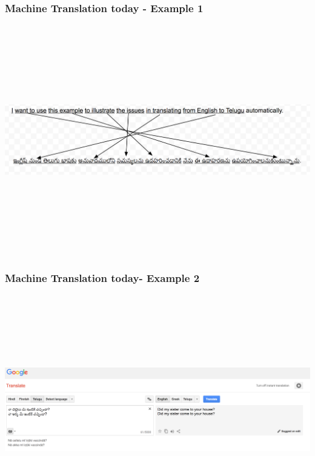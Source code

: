 \documentclass{beamer}
\begin{document}
\begin{frame}
\frametitle{Machine Translation today - Example 1}
\includegraphics[height=10cm,width=1.1\textwidth,keepaspectratio]{MTEngTelExample1}
\end{frame}

\begin{frame}
\frametitle{Machine Translation today- Example 2}
\includegraphics[height=10cm,width=1.1\textwidth,keepaspectratio]{chelleluakka}
\end{frame}
\end{document}
